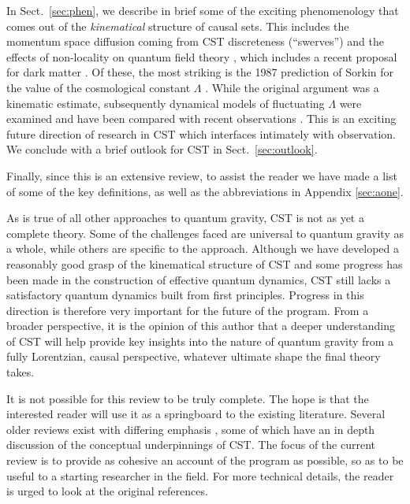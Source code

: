 In Sect.~\ref{sec:phen}, we describe in brief some of the exciting
phenomenology that comes out of the \emph{kinematical} structure of
causal sets. This includes the momentum space diffusion coming from CST
discreteness (``swerves'') \citep{swerves} and the effects of non-locality on quantum field theory \citep{sorkinnonlocal}, which includes a 
recent proposal for dark matter \citep{darkmatter}. Of these, the most striking is the 1987 prediction of
Sorkin for the value of the cosmological constant
$\Lambda$ \citep{lambdaone,lambdatwo}. While the original argument was a kinematic estimate, subsequently dynamical
models of fluctuating $\Lambda$ were examined \citep{lambdathree,eptwo,recentlambda} and have been compared with recent observations
\citep{recentlambda}. This is an exciting future direction of research in CST which interfaces intimately with
observation. We conclude with a brief outlook for CST in Sect.~\ref{sec:outlook}.

Finally, since this is an extensive review, to assist the reader  we have made a  list of some of the key definitions,
as well as the abbreviations  in Appendix \ref{sec:aone}.  

As is true of all other approaches to quantum gravity, CST
is not as yet a complete theory. Some of the challenges faced are universal to quantum gravity as a whole, while
others are specific to the approach. Although we have developed a reasonably good grasp of the 
kinematical structure of CST and some progress has been made in the construction of effective quantum dynamics, CST still lacks a
satisfactory quantum dynamics built from first principles. Progress in this direction is therefore very important for
the future of the program.  From a broader perspective, it is the opinion of this author that a deeper understanding of CST will help provide key insights into the nature of quantum
gravity from a fully Lorentzian, causal perspective, whatever ultimate shape the final theory takes. 

It is not possible for this review to be truly complete. The hope is that the interested reader will use it 
as a springboard to the existing literature. Several older reviews  exist with differing emphasis  
\citep{lambdaone,valdivia,joereviewone,fayreview, lightlinks, fayreview, joereviewtwo,walldenreview}, some of which 
have an in depth discussion of the conceptual underpinnings of CST.  The
focus of the current review is to provide as cohesive an account of the program as possible, so as to be
useful to a starting researcher in the field. For more technical details, the reader is urged to look at the original
references. 


